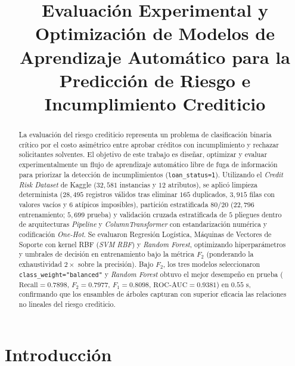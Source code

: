 \documentclass[conference]{IEEEtran}
\begin{document}
\title{Evaluación Experimental y Optimización de Modelos de Aprendizaje Automático para la Predicción de Riesgo e Incumplimiento Crediticio}

\author{%
}

\maketitle

\begin{abstract}
La evaluación del riesgo crediticio representa un problema de clasificación binaria crítico por el costo asimétrico entre aprobar créditos con incumplimiento y rechazar solicitantes solventes. El objetivo de este trabajo es diseñar, optimizar y evaluar experimentalmente un flujo de aprendizaje automático libre de fuga de información para priorizar la detección de incumplimientos (\texttt{loan\_status=1}). Utilizando el \textit{Credit Risk Dataset} de Kaggle ($32{,}581$ instancias y $12$ atributos), se aplicó limpieza determinista ($28{,}495$ registros válidos tras eliminar $165$ duplicados, $3{,}915$ filas con valores vacíos y $6$ atípicos imposibles), partición estratificada $80/20$ ($22{,}796$ entrenamiento; $5{,}699$ prueba) y validación cruzada estratificada de $5$ pliegues dentro de arquitecturas \textit{Pipeline} y \textit{ColumnTransformer} con estandarización numérica y codificación \textit{One-Hot}. Se evaluaron Regresión Logística, Máquinas de Vectores de Soporte con kernel RBF (\textit{SVM RBF}) y \textit{Random Forest}, optimizando hiperparámetros y umbrales de decisión en entrenamiento bajo la métrica $F_2$ (ponderando la exhaustividad $2\times$ sobre la precisión). Bajo $F_2$, los tres modelos seleccionaron \texttt{class\_weight="balanced"} y \textit{Random Forest} obtuvo el mejor desempeño en prueba ($\text{Recall}=0.7898$, $F_2=0.7977$, $F_1=0.8098$, $\text{ROC-AUC}=0.9381$) en $0.55\text{ s}$, confirmando que los ensambles de árboles capturan con superior eficacia las relaciones no lineales del riesgo crediticio.
\end{abstract}

\section{Introducción}
\end{document}
